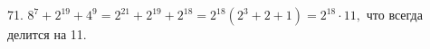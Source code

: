 71. $8^7+2^{19}+4^9=2^{21}+2^{19}+2^{18}=2^{18}(2^3+2+1)=2^{18}\cdot11,$ что всегда делится на 11.\\
